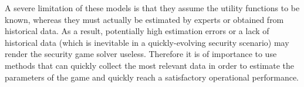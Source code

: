 A severe limitation of these models is that they assume the utility functions to be known, whereas they must actually be estimated by experts or obtained from historical data. As a result, potentially high estimation errors or a lack of historical data (which is inevitable in a quickly-evolving security scenario) may render the security game solver useless. 
Therefore it is of importance to use methods that can quickly collect the most relevant data  in order to estimate the parameters of the game and quickly reach a satisfactory operational performance.



